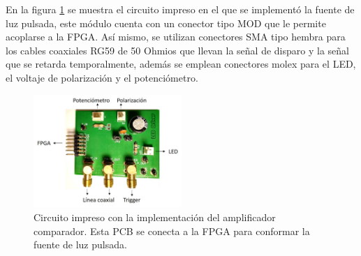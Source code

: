 En la figura \ref{fig:LED_PCB} se muestra el circuito impreso en el que se implementó la fuente de luz pulsada, este módulo cuenta con un conector tipo MOD que le permite acoplarse a la FPGA. Así mismo, se utilizan conectores  SMA tipo hembra para los cables coaxiales RG59 de 50 Ohmios que llevan la señal de disparo y la señal que se retarda temporalmente, además se emplean conectores molex para el LED, el voltaje de polarización y el potenciómetro.
\begin{figure}[h!]
\begin{centering}
  \includegraphics[width=0.5\textwidth]{Images/LED_PCB.jpg}
    \caption{Circuito impreso con la implementación del amplificador comparador. Esta PCB se conecta a la FPGA para conformar la fuente de luz pulsada. }
    \label{fig:LED_PCB}
  \par\end{centering}
\end{figure}
